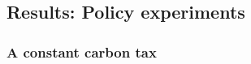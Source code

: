 \subsection{Results: Policy experiments}\label{app:polexp}


\subsubsection{A constant carbon tax}\label{app:polexp_cc}

%
%
